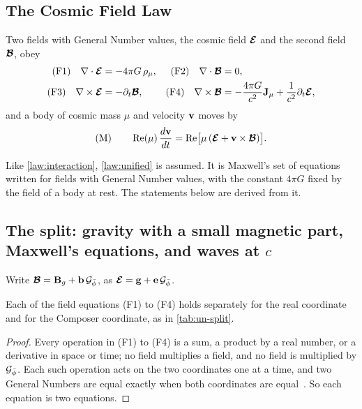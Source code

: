 \subsection{The Cosmic Field Law}\label{subsec:un-law}

\begin{postulate}\label{law:unified}
Two fields with General Number values, the cosmic field $\boldsymbol{\mathcal{E}}$ and the second field $\boldsymbol{\mathcal{B}}$, obey
\begin{align*}
\text{(F1)}\quad \nabla\cdot\boldsymbol{\mathcal{E}} &= -4\pi G\,\rho_\mu , & \text{(F2)}\quad \nabla\cdot\boldsymbol{\mathcal{B}} &= 0 ,\\
\text{(F3)}\quad \nabla\times\boldsymbol{\mathcal{E}} &= -\partial_t\boldsymbol{\mathcal{B}} , & \text{(F4)}\quad \nabla\times\boldsymbol{\mathcal{B}} &= -\frac{4\pi G}{c^2}\mathbf{J}_\mu + \frac{1}{c^2}\partial_t\boldsymbol{\mathcal{E}} ,
\end{align*}
and a body of cosmic mass $\mu$ and velocity $\mathbf{v}$ moves by
\[
\text{(M)}\qquad \operatorname{Re}(\mu)\,\frac{d\mathbf{v}}{dt} = \operatorname{Re}\bigl[\mu\,(\boldsymbol{\mathcal{E}} + \mathbf{v}\times\boldsymbol{\mathcal{B}})\bigr] .
\]
\end{postulate}

Like \cref{law:interaction}, \cref{law:unified} is assumed. It is Maxwell's set of equations written for fields with General Number values, with the constant $4\pi G$ fixed by the field of a body at rest. The statements below are derived from it.

\subsection{The split: gravity with a small magnetic part, Maxwell's equations, and waves at \texorpdfstring{$c$}{c}}\label{subsec:un-split}

Write $\boldsymbol{\mathcal{B}} = \mathbf{B}_g + \mathbf{b}\,\mathcal{G}_{\bar{\phi}}$, as $\boldsymbol{\mathcal{E}} = \mathbf{g} + \mathbf{e}\,\mathcal{G}_{\bar{\phi}}$.

\begin{proposition}\label{prop:un-split}
Each of the field equations (F1) to (F4) holds separately for the real coordinate and for the Composer coordinate, as in \cref{tab:un-split}.
\end{proposition}

\begin{proof}
Every operation in (F1) to (F4) is a sum, a product by a real number, or a derivative in space or time; no field multiplies a field, and no field is multiplied by $\mathcal{G}_{\bar{\phi}}$. Each such operation acts on the two coordinates one at a time, and two General Numbers are equal exactly when both coordinates are equal~\citep[Remark~3.3]{DerrazGN2026}. So each equation is two equations.
\end{proof}

